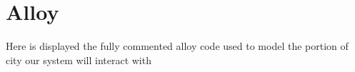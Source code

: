\section{Alloy}

Here is displayed the fully commented alloy code used to model the portion of city
our system will interact with

